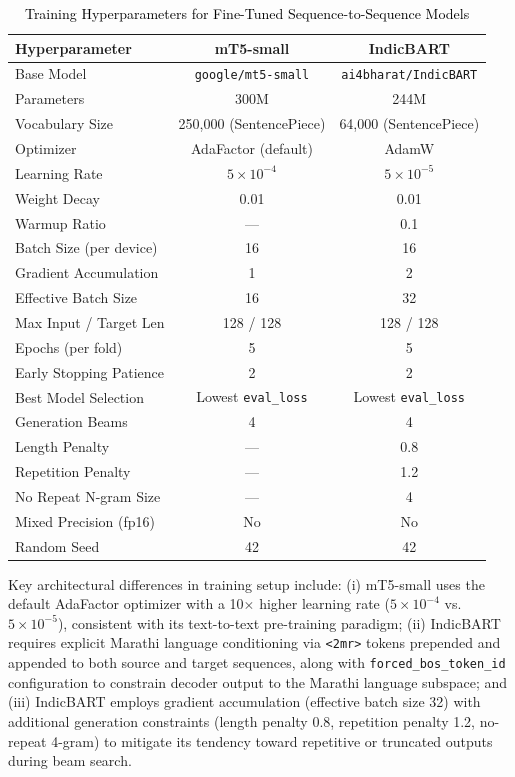 \begin{table}[t]
\color{black}
\centering
\caption{\textcolor{black}{Training Hyperparameters for Fine-Tuned Sequence-to-Sequence Models}}
\label{tab:training_config}
\begin{tabular}{lcc}
\hline
\textbf{Hyperparameter} & \textbf{mT5-small} & \textbf{IndicBART} \\
\hline
Base Model & \texttt{google/mt5-small} & \texttt{ai4bharat/IndicBART} \\
Parameters & 300M & 244M \\
Vocabulary Size & 250,000 (SentencePiece) & 64,000 (SentencePiece) \\
Optimizer & AdaFactor (default) & AdamW \\
Learning Rate & $5 \times 10^{-4}$ & $5 \times 10^{-5}$ \\
Weight Decay & 0.01 & 0.01 \\
Warmup Ratio & --- & 0.1 \\
Batch Size (per device) & 16 & 16 \\
Gradient Accumulation & 1 & 2 \\
Effective Batch Size & 16 & 32 \\
Max Input / Target Len & 128 / 128 & 128 / 128 \\
Epochs (per fold) & 5 & 5 \\
Early Stopping Patience & 2 & 2 \\
Best Model Selection & Lowest \texttt{eval\_loss} & Lowest \texttt{eval\_loss} \\
Generation Beams & 4 & 4 \\
Length Penalty & --- & 0.8 \\
Repetition Penalty & --- & 1.2 \\
No Repeat N-gram Size & --- & 4 \\
Mixed Precision (fp16) & No & No \\
Random Seed & 42 & 42 \\
\hline
\end{tabular}
\end{table}

Key architectural differences in training setup include: (i) mT5-small uses the default AdaFactor optimizer with a 10$\times$ higher learning rate ($5 \times 10^{-4}$ vs.\ $5 \times 10^{-5}$), consistent with its text-to-text pre-training paradigm; (ii) IndicBART requires explicit Marathi language conditioning via \texttt{<2mr>} tokens prepended and appended to both source and target sequences, along with \texttt{forced\_bos\_token\_id} configuration to constrain decoder output to the Marathi language subspace; and (iii) IndicBART employs gradient accumulation (effective batch size 32) with additional generation constraints (length penalty 0.8, repetition penalty 1.2, no-repeat 4-gram) to mitigate its tendency toward repetitive or truncated outputs during beam search.

